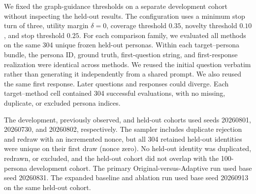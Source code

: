 \documentclass{ieeeaccess}
\begin{document}
We fixed the graph-guidance thresholds on a separate development cohort without inspecting
the held-out results. The configuration uses a minimum stop turn of three,
utility margin $\delta=0$, coverage threshold $0.35$, novelty threshold $0.10$, and stop
threshold $0.25$. 
For each comparison family, we evaluated all methods on the same 304 unique frozen
held-out personas. Within each target--persona bundle, the persona ID, ground truth,
first-question string, and first-response realization were identical across methods.
We reused the initial question verbatim rather than generating it independently from a
shared prompt. We also reused the same first response. Later questions and responses
could diverge.
Each target--method cell contained 304 successful evaluations, with no missing, duplicate,
or excluded persona indices.

The development, previously observed, and held-out cohorts used seeds 20260801, 20260730,
and 20260802, respectively. The sampler includes duplicate rejection and redraw with an
incremented nonce, but all 304 retained held-out identities were unique on their first draw
(nonce zero). No held-out identity was duplicated, redrawn, or excluded, and the held-out
cohort did not overlap with the 100-persona development cohort. The primary Original-versus-Adaptive run used base
seed 20260831. The expanded baseline and ablation run used base seed 20260913 on the same
held-out cohort.
\end{document}
